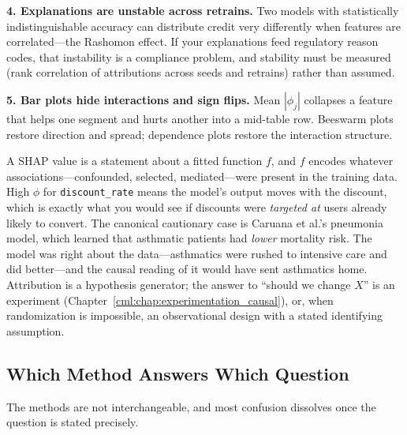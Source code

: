\textbf{4. Explanations are unstable across retrains.} Two models with statistically indistinguishable accuracy can distribute credit very differently when features are correlated---the Rashomon effect. If your explanations feed regulatory reason codes, that instability is a compliance problem, and stability must be measured (rank correlation of attributions across seeds and retrains) rather than assumed.

\textbf{5. Bar plots hide interactions and sign flips.} Mean $|\phi_j|$ collapses a feature that helps one segment and hurts another into a mid-table row. Beeswarm plots restore direction and spread; dependence plots restore the interaction structure.

\begin{keyinsight}
A SHAP value is a statement about a fitted function $f$, and $f$ encodes whatever associations---confounded, selected, mediated---were present in the training data. High $\phi$ for \texttt{discount\_rate} means the model's output moves with the discount, which is exactly what you would see if discounts were \emph{targeted at} users already likely to convert. The canonical cautionary case is Caruana et al.'s pneumonia model, which learned that asthmatic patients had \emph{lower} mortality risk. The model was right about the data---asthmatics were rushed to intensive care and did better---and the causal reading of it would have sent asthmatics home. Attribution is a hypothesis generator; the answer to ``should we change $X$'' is an experiment (Chapter~\ref{cml:chap:experimentation_causal}), or, when randomization is impossible, an observational design with a stated identifying assumption.
\end{keyinsight}

\subsection{Which Method Answers Which Question}

The methods are not interchangeable, and most confusion dissolves once the question is stated precisely.

